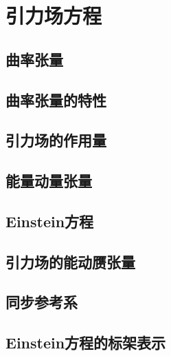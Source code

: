 \chapter{引力场方程}

\section{曲率张量}

\section{曲率张量的特性}

\section{引力场的作用量}

\section{能量动量张量}

\section{Einstein方程}

\section{引力场的能动赝张量}

\section{同步参考系}

\section{Einstein方程的标架表示}

